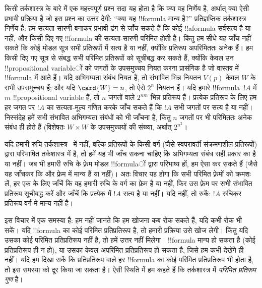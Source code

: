 \documentclass[../../../include/open-logic-section]{subfiles}
\begin{document}


किसी तर्कशास्त्र के बारे में एक महत्त्वपूर्ण प्रश्न सदा यह होता है कि क्या
वह निर्णेय है, अर्थात् क्या ऐसी प्रभावी प्रक्रिया है जो इस प्रश्न का उत्तर
देगी: ``क्या यह !!{formula} मान्य है?'' प्रतिज्ञप्तिक तर्कशास्त्र निर्णेय है:
हम सत्यता-सारणी बनाकर प्रभावी ढंग से जाँच सकते हैं कि कोई !!a{formula}
सर्वसत्य है या नहीं, और किसी दिए गए !!{formula} की सत्यता-सारणी परिमित होती
है। किंतु हम सीधे यह जाँच नहीं सकते कि कोई मोडल सूत्र सभी प्रतिरूपों में
सत्य है या नहीं, क्योंकि प्रतिरूप अपरिमिततः अनेक हैं। हम किसी दिए गए सूत्र
से संबद्ध सभी परिमित प्रतिरूपों को सूचीबद्ध कर सकते हैं, क्योंकि केवल उन
!!{propositional variable}ों को जगतों के उपसमुच्चय नियत करना प्रासंगिक है जो
वास्तव में !!{formula} में आते हैं। यदि अभिगम्यता संबंध नियत है, तो संभावित
भिन्न नियतन $V(p)$ केवल $W$ के सभी उपसमुच्चय हैं; और यदि $\card{W} = n$,
तो ऐसे $2^n$ नियतन हैं। यदि हमारे !!{formula}~$!A$ में $m$ !!{propositional variable} हैं, तो $n$ जगतों वाले $2^{nm}$ भिन्न प्रतिरूप हैं। प्रत्येक प्रतिरूप
के लिए हम हर जगत पर $!A$ का सत्यता-मूल्य गणित करके जाँच सकते हैं कि $!A$
सभी जगतों पर सत्य है या नहीं। निस्संदेह हमें सभी संभावित अभिगम्यता संबंधों
को भी जाँचना है, किंतु $n$ जगतों पर भी परिमिततः अनेक संबंध ही होते हैं
(विशेषतः $W \times W$ के उपसमुच्चयों की संख्या, अर्थात् $2^{n^2}$।

यदि हमारी रुचि तर्कशास्त्र~ में नहीं, बल्कि प्रतिरूपों के किसी वर्ग
(जैसे स्वपरावर्ती संक्रमणशील प्रतिरूपों) द्वारा परिभाषित तर्कशास्त्र में
है, तो हमें यह भी जाँच सकना चाहिए कि अभिगम्यता संबंध सही प्रकार का है या
नहीं। जब भी हमारी रुचि के फ़्रेम मोडल !!{formula}ों द्वारा परिभाष्य हों, हम
ऐसा कर सकते हैं (जैसे यह जाँचकर कि  और  फ़्रेम में मान्य हैं
या नहीं)। अतः विचार यह होगा कि सभी परिमित फ़्रेमों को क्रमशः लें, हर एक के
लिए जाँचें कि वह हमारी रुचि के वर्ग का फ़्रेम है या नहीं, फिर उस फ़्रेम पर
सभी संभावित प्रतिरूप सूचीबद्ध करें और जाँचें कि प्रत्येक में $!A$ सत्य है
या नहीं। यदि नहीं, तो रुकें: $!A$ रुचिकर प्रतिरूप-वर्ग में मान्य नहीं है।

इस विचार में एक समस्या है: हम नहीं जानते कि हम खोजना कब रोक सकते हैं, यदि
कभी रोक भी सकें। यदि !!{formula} का कोई परिमित प्रतिप्रतिरूप है, तो हमारी
प्रक्रिया उसे खोज लेगी। किंतु यदि उसका कोई परिमित प्रतिप्रतिरूप नहीं है,
तो हमें उत्तर नहीं मिलेगा। !!{formula} मान्य हो सकता है (कोई प्रतिप्रतिरूप
ही न हो), या उसका केवल अपरिमित प्रतिप्रतिरूप हो सकता है, जिसे हम कभी
देखेंगे ही नहीं। यदि हम दिखा सकें कि प्रतिप्रतिरूप वाले हर !!{formula} का
कोई परिमित प्रतिप्रतिरूप भी होता है, तो इस समस्या को दूर किया जा सकता है।
ऐसी स्थिति में हम कहते हैं कि तर्कशास्त्र में \emph{परिमित प्रतिरूप गुण}
है।
\end{document}
